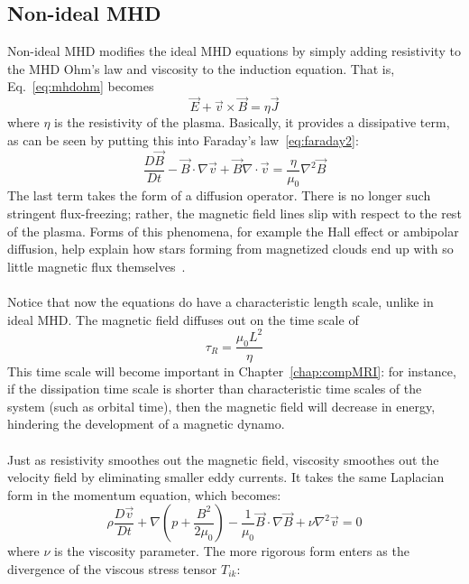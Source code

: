 \subsection{Non-ideal MHD} \label{ssec:nimhd}
Non-ideal MHD modifies the ideal MHD equations by simply adding resistivity to the MHD Ohm's law and viscosity to the induction equation. That is, Eq.~\ref{eq:mhdohm} becomes
\begin{equation}
  \vec E+\vec v\times\vec B=\eta\vec J
\end{equation}
where $\eta$ is the resistivity of the plasma. Basically, it provides a dissipative term, as can be seen by putting this into Faraday's law~\ref{eq:faraday2}:
\begin{equation}
  \frac{D\vec B}{Dt}-\vec B\cdot\nabla\vec v+\vec B\nabla\cdot\vec v=\frac{\eta}{\mu_0}\nabla^2\vec B
\end{equation}
The last term takes the form of a diffusion operator. There is no longer such stringent flux-freezing; rather, the magnetic field lines slip with respect to the rest of the plasma. Forms of this phenomena, for example the Hall effect or ambipolar diffusion, help explain how stars forming from magnetized clouds end up with so little magnetic flux themselves~\cite{AST521HW4}.\\
\\
Notice that now the equations do have a characteristic length scale, unlike in ideal MHD. The magnetic field diffuses out on the time scale of
\begin{equation}
  \tau_R=\frac{\mu_0L^2}{\eta}
\end{equation}
This time scale will become important in Chapter~\ref{chap:compMRI}: for instance, if the dissipation time scale is shorter than characteristic time scales of the system (such as orbital time), then the magnetic field will decrease in energy, hindering the development of a magnetic dynamo. \\
\\
Just as resistivity smoothes out the magnetic field, viscosity smoothes out the velocity field by eliminating smaller eddy currents. It takes the same Laplacian form in the momentum equation, which becomes:
\begin{equation}
  \rho\frac{D\vec v}{Dt}+\nabla\left(p+\frac{B^2}{2\mu_0}\right)-\frac1{\mu_0}\vec B\cdot\nabla\vec B+\nu\nabla^2\vec v=0 \label{eq:momvisc}
\end{equation}
where $\nu$ is the viscosity parameter. The more rigorous form enters as the divergence of the viscous stress tensor $T_{ik}$:
